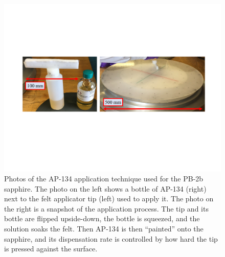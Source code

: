 \begin{figure}[!t]
    \centering
    \includegraphics[width=\linewidth, trim=2cm 7.5cm 2cm 6cm, clip]{ARCoating/Figures/sapphire_ap_application.pdf}
    \caption[Photos of the upgraded AP-134 application technique used for the PB-2b sapphire.]{Photos of the AP-134 application technique used for the PB-2b sapphire. The photo on the left shows a bottle of AP-134 (right) next to the felt applicator tip (left) used to apply it. The photo on the right is a snapshot of the application process. The tip and its bottle are flipped upside-down, the bottle is squeezed, and the solution soaks the felt. Then AP-134 is then ``painted'' onto the sapphire, and its dispensation rate is controlled by how hard the tip is pressed against the surface.}
    \label{fig:sapphire_ap_application}
\end{figure}

